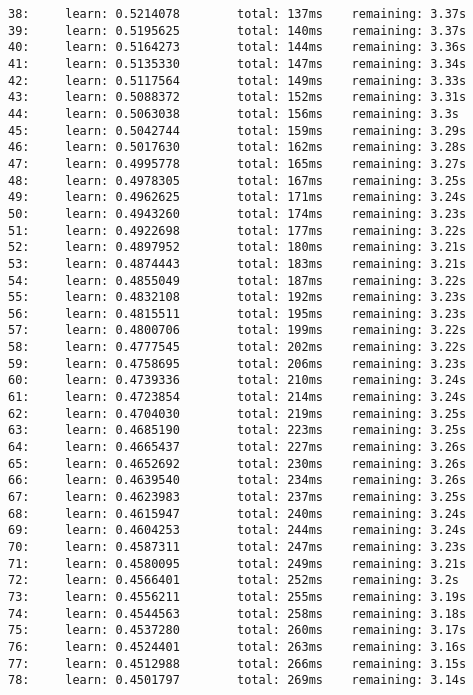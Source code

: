 \documentclass[11pt]{article}
\begin{document}
\begin{Verbatim}[commandchars=\\\{\}]
38:     learn: 0.5214078        total: 137ms    remaining: 3.37s
39:     learn: 0.5195625        total: 140ms    remaining: 3.37s
40:     learn: 0.5164273        total: 144ms    remaining: 3.36s
41:     learn: 0.5135330        total: 147ms    remaining: 3.34s
42:     learn: 0.5117564        total: 149ms    remaining: 3.33s
43:     learn: 0.5088372        total: 152ms    remaining: 3.31s
44:     learn: 0.5063038        total: 156ms    remaining: 3.3s
45:     learn: 0.5042744        total: 159ms    remaining: 3.29s
46:     learn: 0.5017630        total: 162ms    remaining: 3.28s
47:     learn: 0.4995778        total: 165ms    remaining: 3.27s
48:     learn: 0.4978305        total: 167ms    remaining: 3.25s
49:     learn: 0.4962625        total: 171ms    remaining: 3.24s
50:     learn: 0.4943260        total: 174ms    remaining: 3.23s
51:     learn: 0.4922698        total: 177ms    remaining: 3.22s
52:     learn: 0.4897952        total: 180ms    remaining: 3.21s
53:     learn: 0.4874443        total: 183ms    remaining: 3.21s
54:     learn: 0.4855049        total: 187ms    remaining: 3.22s
55:     learn: 0.4832108        total: 192ms    remaining: 3.23s
56:     learn: 0.4815511        total: 195ms    remaining: 3.23s
57:     learn: 0.4800706        total: 199ms    remaining: 3.22s
58:     learn: 0.4777545        total: 202ms    remaining: 3.22s
59:     learn: 0.4758695        total: 206ms    remaining: 3.23s
60:     learn: 0.4739336        total: 210ms    remaining: 3.24s
61:     learn: 0.4723854        total: 214ms    remaining: 3.24s
62:     learn: 0.4704030        total: 219ms    remaining: 3.25s
63:     learn: 0.4685190        total: 223ms    remaining: 3.25s
64:     learn: 0.4665437        total: 227ms    remaining: 3.26s
65:     learn: 0.4652692        total: 230ms    remaining: 3.26s
66:     learn: 0.4639540        total: 234ms    remaining: 3.26s
67:     learn: 0.4623983        total: 237ms    remaining: 3.25s
68:     learn: 0.4615947        total: 240ms    remaining: 3.24s
69:     learn: 0.4604253        total: 244ms    remaining: 3.24s
70:     learn: 0.4587311        total: 247ms    remaining: 3.23s
71:     learn: 0.4580095        total: 249ms    remaining: 3.21s
72:     learn: 0.4566401        total: 252ms    remaining: 3.2s
73:     learn: 0.4556211        total: 255ms    remaining: 3.19s
74:     learn: 0.4544563        total: 258ms    remaining: 3.18s
75:     learn: 0.4537280        total: 260ms    remaining: 3.17s
76:     learn: 0.4524401        total: 263ms    remaining: 3.16s
77:     learn: 0.4512988        total: 266ms    remaining: 3.15s
78:     learn: 0.4501797        total: 269ms    remaining: 3.14s

\end{Verbatim}
\end{document}
